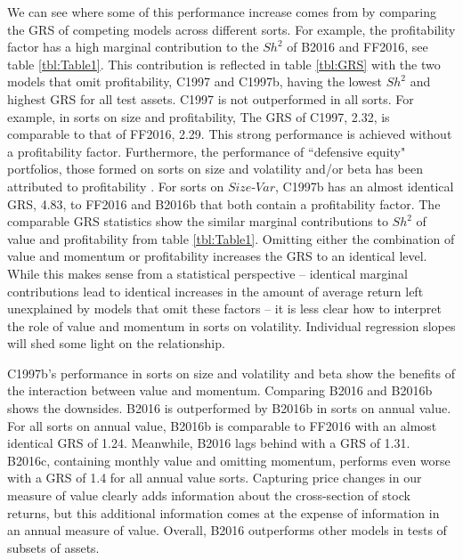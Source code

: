 We can see where some of this performance increase comes from by comparing the GRS of
competing models across different sorts. For example, the profitability factor has a high
marginal contribution to the $Sh^2$ of B2016 and FF2016, see table \ref{tbl:Table1}. This
contribution is reflected in table \ref{tbl:GRS} with the two models that omit
profitability, C1997 and C1997b, having the lowest $Sh^2$ and highest GRS for all test
assets. C1997 is not outperformed in all sorts. For example, in sorts on size and
profitability, The GRS of C1997, 2.32, is comparable to that of FF2016, 2.29. This strong
performance is achieved without a profitability factor. Furthermore, the performance of
``defensive equity" portfolios, those formed on sorts on size and volatility and/or beta
has been attributed to profitability \parencite{novy2014understanding}. For sorts on
$Size$-$Var$, C1997b has an almost identical GRS, 4.83, to FF2016 and B2016b that both
contain a profitability factor. The comparable GRS statistics show the similar marginal
contributions to $Sh^2$ of value and profitability from table \ref{tbl:Table1}. Omitting
either the combination of value and momentum or profitability increases the GRS to an
identical level. While this makes sense from a statistical perspective -- identical
marginal contributions lead to identical increases in the amount of average return left
unexplained by models that omit these factors -- it is less clear how to interpret the
role of value and momentum in sorts on volatility. Individual regression slopes will shed
some light on the relationship.

C1997b's performance in sorts on size and volatility and beta show the benefits of the
interaction between value and momentum. Comparing B2016 and B2016b shows the downsides.
B2016 is outperformed by B2016b in sorts on annual value. For all sorts on annual value,
B2016b is comparable to FF2016 with an almost identical GRS of 1.24. Meanwhile, B2016 lags
behind with a GRS of 1.31. B2016c, containing monthly value and omitting momentum,
performs even worse with a GRS of 1.4 for all annual value sorts. Capturing price changes
in our measure of value clearly adds information about the cross-section of stock returns,
but this additional information comes at the expense of information in an annual measure
of value. Overall, B2016 outperforms other models in tests of subsets of assets.
